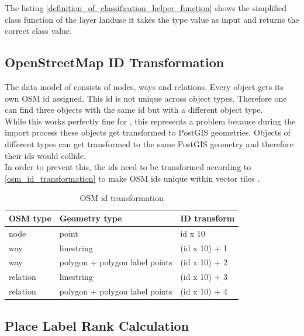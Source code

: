 The listing \autoref{definition_of_classification_helper_function} shows the simplified class function of the layer landuse it takes the type value as input and returns the correct class value. 

\subsection{OpenStreetMap ID Transformation}

The data model of \osm{} consists of nodes, ways and relations. Every object gets its own OSM id assigned. This id is not unique across object types. Therefore one can find three objects with the same id but with a different object type.\\
While this works perfectly fine for \osm{}, this represents a problem because during the import process these \osm{} objects get transformed to PostGIS geometries. Objects of different types can get transformed to the same PostGIS geometry and therefore their ids would collide.
\\
In order to prevent this, the ids need to be transformed according to \autoref{osm_id_transformation} to make OSM ids unique within vector tiles \cite{103_mapbox.com_2016}.

\begin{table}[H]
\centering

\begin{tabular}{lll}
\hline
OSM type & Geometry type                  & \osm{} ID transform \\ \hline
node     & point                          & id x 10          \\
way      & linestring                           & (id x 10) + 1    \\
way      & polygon + polygon label points & (id x 10) + 2    \\
relation & linestring                           & (id x 10) + 3    \\
relation & polygon + polygon label points & (id x 10) + 4    \\
\end{tabular}
\caption{OSM id transformation}
\label{osm_id_transformation}
\end{table}

\subsection{Place Label Rank Calculation}\label{place_label_rank_calc}

